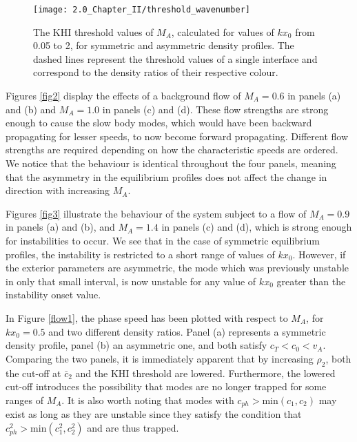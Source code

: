 \begin{figure}[!t]
\centering
\texttt{[image: 2.0\_Chapter\_II/threshold\_wavenumber]}
\caption{The KHI threshold values of $M_A$, calculated for values of $k x_0$ from 0.05 to 2, for symmetric and asymmetric density profiles. The dashed lines represent the threshold values of a single interface and correspond to the density ratios of their respective colour.}
\label{threshold_wavenumber}
\end{figure}

Figures \ref{fig2} display the effects of a background flow of $M_A = 0.6$ in panels (a) and (b) and $M_A = 1.0$ in panels (c) and (d). These flow strengths are strong enough to cause the slow body modes, which would have been backward propagating for lesser speeds, to now become forward propagating. Different flow strengths are required depending on how the characteristic speeds are ordered. We notice that the behaviour is identical throughout the four panels, meaning that the asymmetry in the equilibrium profiles does not affect the change in direction with increasing $M_A$.

Figures \ref{fig3} illustrate the behaviour of the system subject to a flow of $M_A = 0.9$ in panels (a) and (b), and $M_A = 1.4$ in panels (c) and (d), which is strong enough for instabilities to occur. We see that in the case of symmetric equilibrium profiles, the instability is restricted to a short range of values of $k x_0$. However, if the exterior parameters are asymmetric, the mode which was previously unstable in only that small interval, is now unstable for any value of $k x_0$ greater than the instability onset value.

In Figure \ref{flow1}, the phase speed has been plotted with respect to $M_A$, for $k x_0 = 0.5$ and two different density ratios. Panel (a) represents a symmetric density profile, panel (b) an asymmetric one, and both satisfy $c_T < c_0 < v_A$. Comparing the two panels, it is immediately apparent that by increasing $\rho_2$, both the cut-off at $\bar c_2$ and the KHI threshold are lowered. Furthermore, the lowered cut-off introduces the possibility that modes are no longer trapped for some ranges of $M_A$. It is also worth noting that modes with $c_{ph} > \textrm{min}(c_1, c_2)$ may exist as long as they are unstable since they satisfy the condition that $c_{ph}^2 > \textrm{min}(c_1^2, c_2^2)$ and are thus trapped.

